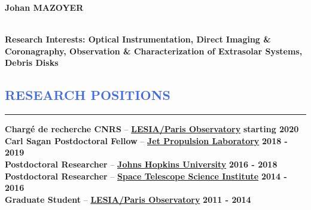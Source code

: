 \documentclass[12pt]{article}
\begin{document}
\lhead[]{}

\begin{huge}
\noindent\textbf{Johan MAZOYER}
\end{huge}\\


\textbf{Research Interests: Optical Instrumentation, Direct Imaging \& Coronagraphy,
Observation \& Characterization of Extrasolar Systems, Debris Disks}\\


\vspace{-1cm}
\textcolor{RoyalBlue}{\section{\large RESEARCH POSITIONS}
\vspace{-0.35cm}\hrule}
\vspace{0.4cm}

\textbf{Chargé de recherche CNRS} --
\href{http://www.obspm.fr/?lang=en}{\textbf{LESIA/Paris Observatory}}
\hfill     	 { \bf starting 2020}\\


\textbf{Carl Sagan Postdoctoral Fellow} --
\href{https://www.jpl.nasa.gov/}{\textbf{Jet Propulsion Laboratory}}
\hfill      { \bf 2018 - 2019}\\


\textbf{Postdoctoral Researcher} --
\href{http://physics-astronomy.jhu.edu/}{\textbf{Johns Hopkins University}}
\hfill   	 { \bf 2016 - 2018}\\


\textbf{Postdoctoral Researcher} --
{\href{http://www.stsci.edu}{\textbf{Space Telescope Science Institute}}}
\hfill        { \bf 2014 - 2016}\\

\textbf{Graduate Student} --
\href{http://www.obspm.fr/?lang=en}{\textbf{LESIA/Paris Observatory}}
\hfill        { \bf 2011 - 2014}\\


\end{document}
